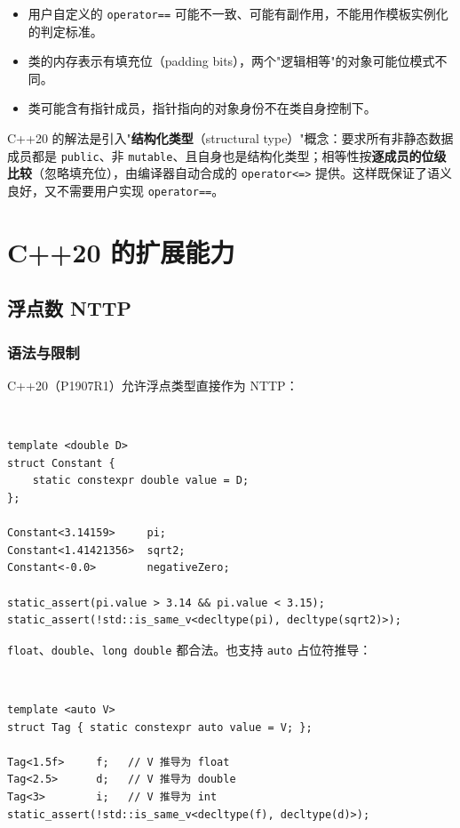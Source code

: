 \documentclass[12pt,a4paper,fontset=fandol]{ctexbook}
\newcommand{\cpplabel}{%
  \tcbox[on line,colback=cppheadbg,colframe=cppheadbg,
    boxrule=0pt,arc=1pt,left=2pt,right=2pt,top=1pt,bottom=1pt,
    colupper=white,fontupper=\scriptsize\bfseries]{C++}}
\newcommand{\cpp}[1]{C++#1}
\newcommand{\kw}[1]{\texttt{#1}}
\begin{document}
\begin{itemize}
  \item 用户自定义的 \kw{operator==} 可能不一致、可能有副作用，不能用作模板实例化的判定标准。
  \item 类的内存表示有填充位（padding bits），两个"逻辑相等"的对象可能位模式不同。
  \item 类可能含有指针成员，指针指向的对象身份不在类自身控制下。
\end{itemize}

\cpp{20} 的解法是引入"\textbf{结构化类型}（structural type）"概念：要求所有非静态数据成员都是 \kw{public}、非 \kw{mutable}、且自身也是结构化类型；相等性按\textbf{逐成员的位级比较}（忽略填充位），由编译器自动合成的 \kw{operator<=>} 提供。这样既保证了语义良好，又不需要用户实现 \kw{operator==}。

\part{C++20 的扩展能力}

\chapter{浮点数 NTTP}

\section{语法与限制}

\cpp{20}（P1907R1）允许浮点类型直接作为 NTTP：

\cpplabel\ \begin{lstlisting}
template <double D>
struct Constant {
    static constexpr double value = D;
};

Constant<3.14159>     pi;
Constant<1.41421356>  sqrt2;
Constant<-0.0>        negativeZero;

static_assert(pi.value > 3.14 && pi.value < 3.15);
static_assert(!std::is_same_v<decltype(pi), decltype(sqrt2)>);
\end{lstlisting}

\kw{float}、\kw{double}、\kw{long double} 都合法。也支持 \kw{auto} 占位符推导：

\cpplabel\ \begin{lstlisting}
template <auto V>
struct Tag { static constexpr auto value = V; };

Tag<1.5f>     f;   // V 推导为 float
Tag<2.5>      d;   // V 推导为 double
Tag<3>        i;   // V 推导为 int
static_assert(!std::is_same_v<decltype(f), decltype(d)>);
\end{lstlisting}
\end{document}
